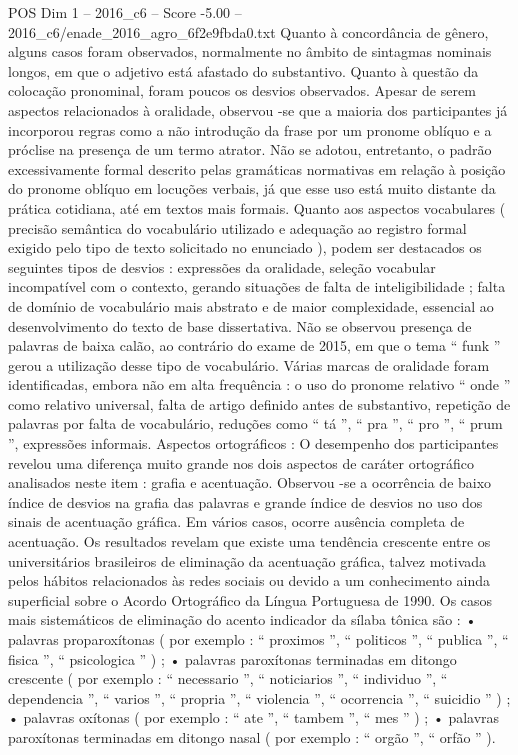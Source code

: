 \begin{textsample}{POS Dim 1 – 2016\_c6 – Score -5.00 – 2016\_c6/enade\_2016\_agro\_6f2e9fbda0.txt}
Quanto à concordância de gênero, alguns casos foram observados, normalmente no âmbito de sintagmas nominais longos, em que o adjetivo está afastado do substantivo.
Quanto à questão da colocação pronominal, foram poucos os desvios observados.
Apesar de serem aspectos relacionados à oralidade, observou -se que a maioria dos participantes já incorporou regras como a não introdução da frase por um pronome oblíquo e a próclise na presença de um termo atrator.
Não se adotou, entretanto, o padrão excessivamente formal descrito pelas gramáticas normativas em relação à posição do pronome oblíquo em locuções verbais, já que esse uso está muito distante da prática cotidiana, até em textos mais formais.
Quanto aos aspectos vocabulares ( precisão semântica do vocabulário utilizado e adequação ao registro formal exigido pelo tipo de texto solicitado no enunciado ), podem ser destacados os seguintes tipos de desvios : expressões da oralidade, seleção vocabular incompatível com o contexto, gerando situações de falta de inteligibilidade ; falta de domínio de vocabulário mais abstrato e de maior complexidade, essencial ao desenvolvimento do texto de base dissertativa.
Não se observou presença de palavras de baixa calão, ao contrário do exame de 2015, em que o tema “ funk ” gerou a utilização desse tipo de vocabulário.
Várias marcas de oralidade foram identificadas, embora não em alta frequência : o uso do pronome relativo “ onde ” como relativo universal, falta de artigo definido antes de substantivo, repetição de palavras por falta de vocabulário, reduções como “ tá ”, “ pra ”, “ pro ”, “ prum ”, expressões informais.
Aspectos ortográficos : O desempenho dos participantes revelou uma diferença muito grande nos dois aspectos de caráter ortográfico analisados neste item : grafia e acentuação.
Observou -se a ocorrência de baixo índice de desvios na grafia das palavras e grande índice de desvios no uso dos sinais de acentuação gráfica.
Em vários casos, ocorre ausência completa de acentuação.
Os resultados revelam que existe uma tendência crescente entre os universitários brasileiros de eliminação da acentuação gráfica, talvez motivada pelos hábitos relacionados às redes sociais ou devido a um conhecimento ainda superficial sobre o Acordo Ortográfico da Língua Portuguesa de 1990.
Os casos mais sistemáticos de eliminação do acento indicador da sílaba tônica são : • palavras proparoxítonas ( por exemplo : “ proximos ”, “ politicos ”, “ publica ”, “ fisica ”, “ psicologica ” ) ; • palavras paroxítonas terminadas em ditongo crescente ( por exemplo : “ necessario ”, “ noticiarios ”, “ individuo ”, “ dependencia ”, “ varios ”, “ propria ”, “ violencia ”, “ ocorrencia ”, “ suicidio ” ) ; • palavras oxítonas ( por exemplo : “ ate ”, “ tambem ”, “ mes ” ) ; • palavras paroxítonas terminadas em ditongo nasal ( por exemplo : “ orgão ”, “ orfão ” ).

\end{textsample}
